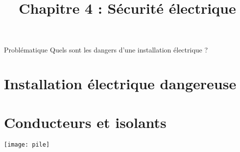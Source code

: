 \documentclass[xcolor={dvipsnames}]{beamer}
\title{Chapitre 4 : Sécurité électrique}
\begin{document}
\begin{frame}
  \titlepage 
\end{frame}


\begin{frame}
\begin{block}{Problématique}
	{\Large Quels sont les dangers d'une installation électrique ?}
\end{block}
\end{frame}


\section{Installation électrique dangereuse}




\begin{frame}
	
\end{frame}



\section{Conducteurs et isolants}

\begin{frame}
	
\end{frame}


\begin{frame}
	\begin{center}
		\texttt{[image: pile]}
	\end{center}
\end{frame}



%
%	
%
%
%	
\end{document}
